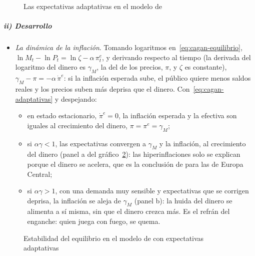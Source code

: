 \documentclass[11pt]{article}
\begin{document}
\begin{figure}[H]
\centering
\caption{Las expectativas adaptativas en el modelo de }\label{fig:cagan-adaptativas}
\end{figure}

\subparagraph{ii) Desarrollo}

\begin{itemize}
\item \emph{La dinámica de la inflación}. Tomando logaritmos en~\eqref{eq:cagan-equilibrio}, $\ln M_t-\ln P_t=\ln\zeta-\alpha\,\pi^e_t$, y derivando respecto al tiempo (la derivada del logaritmo del dinero es $\gamma_M$, la del de los precios, $\pi$, y $\zeta$ es constante), $\gamma_M-\pi=-\alpha\,\dot\pi^e$: si la inflación esperada sube, el público quiere menos saldos reales y los precios suben más deprisa que el dinero. Con~\eqref{eq:cagan-adaptativas} y despejando:
  \begin{itemize}
  \item en estado estacionario, $\dot\pi^e=0$, la inflación esperada y la efectiva son iguales al crecimiento del dinero, $\pi=\pi^e=\gamma_M$;
  \item si $\alpha\gamma<1$, las expectativas convergen a $\gamma_M$ y la inflación, al crecimiento del dinero (panel a del gráfico~\ref{fig:cagan-estabilidad}): las hiperinflaciones solo se explican porque el dinero se acelera, que es la conclusión de  para las de Europa Central;
  \item si $\alpha\gamma>1$, con una demanda muy sensible y expectativas que se corrigen deprisa, la inflación se aleja de $\gamma_M$ (panel b): la huida del dinero se alimenta a sí misma, sin que el dinero crezca más. Es el refrán del enganche: quien juega con fuego, se quema.
  \end{itemize}
\end{itemize}

\begin{figure}[H]
\centering
\caption{Estabilidad del equilibrio en el modelo de  con expectativas adaptativas}\label{fig:cagan-estabilidad}
\end{figure}
\end{document}
